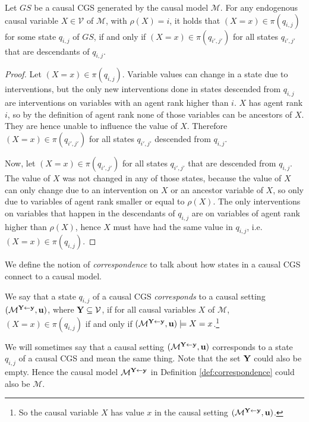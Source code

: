 \begin{lemma}\label{lem:no change after i}
    Let $GS$ be a causal CGS generated by the causal model $\mathcal{M}$. For any endogenous causal variable $X \in \mathcal{V}$ of $\mathcal{M}$, with $\rho(X) = i$, it holds that $(X = x) \in \pi(q_{i,j})$ for some state $q_{i,j}$ of $GS$, if and only if $(X = x) \in \pi(q_{i',j'})$ for all states $q_{i',j'}$ that are descendants of $q_{i,j}$.
\end{lemma}
\begin{proof}
    Let $(X = x) \in \pi(q_{i,j})$. 
    Variable values can change in a state due to interventions, but the only new interventions done in states descended from $q_{i,j}$ are interventions on variables with an agent rank higher than $i$. 
    $X$ has agent rank $i$, so by the definition of agent rank none of those variables can be ancestors of $X$. They are hence unable to influence the value of $X$. 
    Therefore $(X = x) \in \pi(q_{i',j'})$ for all states $q_{i',j'}$ descended from $q_{i,j}$.

    Now, let $(X=x)\in \pi(q_{i',j'})$ for all states $q_{i',j'}$ that are descended from $q_{i,j}$.
    The value of $X$ was not changed in any of those states, because the value of $X$ can only change due to an intervention on $X$ or an ancestor variable of $X$, so only due to variables of agent rank smaller or equal to $\rho(X)$.
    The only interventions on variables that happen in the descendants of $q_{i,j}$ are on variables of agent rank higher than $\rho(X)$, hence $X$ must have had the same value in $q_{i,j}$, i.e. $(X = x) \in \pi(q_{i,j})$.
\end{proof}

We define the notion of \emph{correspondence} to talk about how states in a causal CGS connect to a causal model.
\begin{definition}[Correspondence]\label{def:correspondence}
    We say that a state $q_{i,j}$ of a causal CGS \emph{corresponds} to a causal setting 
    $(\mathcal{M}^{\mathbf{Y} \leftarrow \mathbf{y}},\mathbf{u})$, where $\mathbf{Y} \subseteq \mathcal{V}$, if for all causal variables $X$ of $\mathcal{M}$,
    $(X = x) \in \pi(q_{i,j})$ if and only if $(\mathcal{M}^{\mathbf{Y} \leftarrow \mathbf{y}},\mathbf{u}) \models X = x$.\footnote{So the causal variable $X$ has value $x$ in the causal setting $(\mathcal{M}^{\mathbf{Y} \leftarrow \mathbf{y}},\mathbf{u})$.}
\end{definition}
We will sometimes say that a causal setting $(\mathcal{M}^{\mathbf{Y} \leftarrow \mathbf{y}},\mathbf{u})$ corresponds to a state $q_{i,j}$ of a causal CGS and mean the same thing.
Note that the set $\mathbf{Y}$ could also be empty. Hence the causal model $\mathcal{M}^{\mathbf{Y} \leftarrow \mathbf{y}}$ in Definition \ref{def:correspondence} could also be $\mathcal{M}$.

